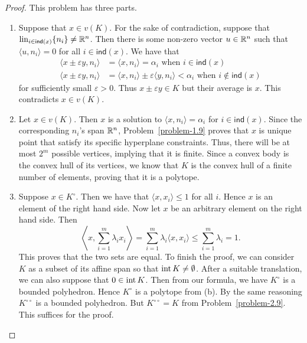 \documentclass[12pt]{article}
\begin{document}
\begin{proof}
	This problem has three parts. 
    	\begin{enumerate}[label = (\alph*)]
    		\item Suppose that $x \in v(K)$. For the sake of contradiction, suppose that $\operatorname{lin}_{i \in \mathsf{ind}(x)} \{n_i\} \neq \mathbb{R}^n$. Then there is some non-zero vector $u \in \mathbb{R}^n$ such that $\langle u, n_i \rangle = 0$ for all $i \in \mathsf{ind}(x)$. We have that 
    		\begin{align*}
    			\langle x \pm \varepsilon y, n_i \rangle & = \langle x, n_i \rangle = \alpha_i \text{ when } i \in \mathsf{ind}(x) \\
    			\langle x \pm \varepsilon y, n_i \rangle & = \langle x, n_i \rangle \pm \varepsilon \langle y, n_i \rangle < \alpha_i \text{ when } i \not\in \mathsf{ind}(x)
    		\end{align*}
    		for sufficiently small $\varepsilon > 0$. Thus $x \pm \varepsilon y \in K$ but their average is $x$. This contradicts $x \in v(K)$. 

    		\item Let $x \in v(K)$. Then $x$ is a solution to $\langle x, n_i \rangle = \alpha_i$ for $i \in \mathsf{ind}(x)$. Since the corresponding $n_i$'s span $\mathbb{R}^n$, Problem~\ref{problem-1.9} proves that $x$ is unique point that satisfy its specific hyperplane constraints. Thus, there will be at most $2^m$ possible vertices, implying that it is finite. Since a convex body is the convex hull of its vertices, we know that $K$ is the convex hull of a finite number of elements, proving that it is a polytope. 

    		\item Suppose $x \in K^\circ$. Then we have that $\langle x, x_i \rangle \leq 1$ for all $i$. Hence $x$ is an element of the right hand side. Now let $x$ be an arbitrary element on the right hand side. Then 
    		\[
    			\left \langle x, \sum_{i = 1}^m \lambda_i x_i \right \rangle = \sum_{i = 1}^m \lambda_i \langle x, x_i \rangle \leq \sum_{i = 1}^m \lambda_i = 1. 
    		\]
    		This proves that the two sets are equal. To finish the proof, we can consider $K$ as a subset of its affine span so that $\operatorname{int} K \neq \emptyset$. After a suitable translation, we can also suppose that $0 \in \operatorname{int} K$. Then from our formula, we have $K^\circ$ is a bounded polyhedron. Hence $K^\circ$ is a polytope from (b). By the same reasoning $K^{\circ \circ}$ is a bounded polyhedron. But $K^{\circ \circ} = K$ from Problem~\ref{problem-2.9}. This suffices for the proof. 
    	\end{enumerate}
\end{proof}
\end{document}
